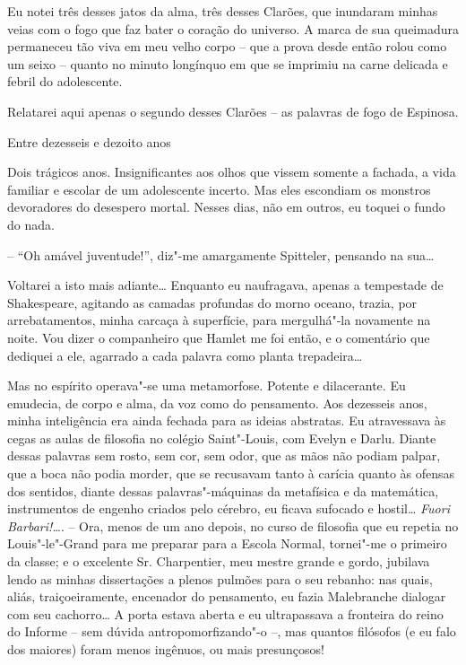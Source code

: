 Eu notei três desses jatos da alma, três desses Clarões, que inundaram
minhas veias com o fogo que faz bater o coração do universo. A marca de
sua queimadura permaneceu tão viva em meu velho corpo -- que a prova
desde então rolou como um seixo -- quanto no minuto longínquo em que se
imprimiu na carne delicada e febril do adolescente.

Relatarei aqui apenas o segundo desses Clarões -- as palavras de fogo de
Espinosa.

Entre dezesseis e dezoito anos

Dois trágicos anos. Insignificantes aos olhos que vissem somente a
fachada, a vida familiar e escolar de um adolescente incerto. Mas eles
escondiam os monstros devoradores do desespero mortal. Nesses dias, não
em outros, eu toquei o fundo do nada.

-- ``Oh amável juventude!'', diz"-me amargamente Spitteler, pensando na sua\ldots{}

Voltarei a isto mais adiante\ldots{} Enquanto eu naufragava, apenas a
tempestade de Shakespeare, agitando as camadas profundas do morno
oceano, trazia, por arrebatamentos, minha carcaça à superfície, para
mergulhá"-la novamente na noite. Vou dizer o companheiro que Hamlet me
foi então, e o comentário que dediquei a ele, agarrado a cada palavra
como planta trepadeira\ldots{}

Mas no espírito operava"-se uma metamorfose. Potente e dilacerante. Eu
emudecia, de corpo e alma, da voz como do pensamento. Aos dezesseis
anos, minha inteligência era ainda fechada para as ideias abstratas. Eu
atravessava às cegas as aulas de filosofia no colégio Saint"-Louis, com
Evelyn e Darlu. Diante dessas palavras sem rosto, sem cor, sem odor, que
as mãos não podiam palpar, que a boca não podia morder, que se recusavam
tanto à carícia quanto às ofensas dos sentidos, diante dessas
palavras"-máquinas da metafísica e da matemática, instrumentos de engenho
criados pelo cérebro, eu ficava sufocado e hostil\ldots{} \emph{Fuori
Barbari!\ldots{}}. -- Ora, menos de um ano depois, no curso de filosofia que
eu repetia no Louis"-le"-Grand para me preparar para a Escola Normal,
tornei"-me o primeiro da classe; e o excelente Sr. Charpentier, meu
mestre grande e gordo, jubilava lendo as minhas dissertações a plenos
pulmões para o seu rebanho: nas quais, aliás, traiçoeiramente, encenador
do pensamento, eu fazia Malebranche dialogar com seu cachorro\ldots{} A porta
estava aberta e eu ultrapassava a fronteira do reino do Informe -- sem
dúvida antropomorfizando"-o --, mas quantos filósofos (e eu falo dos
maiores) foram menos ingênuos, ou mais presunçosos!

